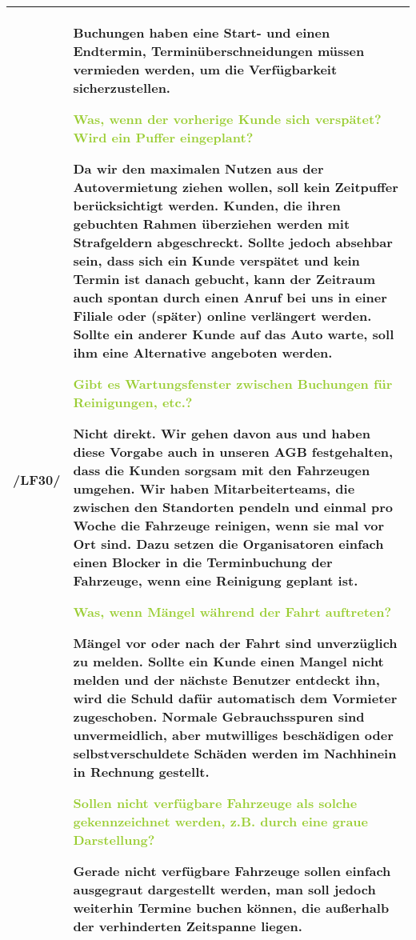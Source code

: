 \begin{tabular}{l | p{13cm}}
    \hline
    /LF30/ & Buchungen haben eine Start- und einen Endtermin, Terminüberschneidungen müssen vermieden werden, um die Verfügbarkeit sicherzustellen. 
    
    \textcolor{YellowGreen}{Was, wenn der vorherige Kunde sich verspätet? Wird ein Puffer eingeplant?}

    \textcolor{NavyBlue}{Da wir den maximalen Nutzen aus der Autovermietung ziehen wollen, soll kein Zeitpuffer berücksichtigt werden. Kunden, die ihren gebuchten Rahmen überziehen werden mit Strafgeldern abgeschreckt. Sollte jedoch absehbar sein, dass sich ein Kunde verspätet und kein Termin ist danach gebucht, kann der Zeitraum auch spontan durch einen Anruf bei uns in einer Filiale oder (später) online verlängert werden. Sollte ein anderer Kunde auf das Auto warte, soll ihm eine Alternative angeboten werden.}

    \textcolor{YellowGreen}{Gibt es Wartungsfenster zwischen Buchungen für Reinigungen, etc.?}

    \textcolor{NavyBlue}{Nicht direkt. Wir gehen davon aus und haben diese Vorgabe auch in unseren AGB festgehalten, dass die Kunden sorgsam mit den Fahrzeugen umgehen. Wir haben Mitarbeiterteams, die zwischen den Standorten pendeln und einmal pro Woche die Fahrzeuge reinigen, wenn sie mal vor Ort sind. Dazu setzen die Organisatoren einfach einen Blocker in die Terminbuchung der Fahrzeuge, wenn eine Reinigung geplant ist.}

    \textcolor{YellowGreen}{Was, wenn Mängel während der Fahrt auftreten?}

    \textcolor{NavyBlue}{Mängel vor oder nach der Fahrt sind unverzüglich zu melden. Sollte ein Kunde einen Mangel nicht melden und der nächste Benutzer entdeckt ihn, wird die Schuld dafür automatisch dem Vormieter zugeschoben. Normale Gebrauchsspuren sind unvermeidlich, aber mutwilliges beschädigen oder selbstverschuldete Schäden werden im Nachhinein in Rechnung gestellt.}

    \textcolor{YellowGreen}{Sollen nicht verfügbare Fahrzeuge als solche gekennzeichnet werden, z.B. durch eine graue Darstellung?}

    \textcolor{NavyBlue}{Gerade nicht verfügbare Fahrzeuge sollen einfach ausgegraut dargestellt werden, man soll jedoch weiterhin Termine buchen können, die außerhalb der verhinderten Zeitspanne liegen.} \\

    \hline
\end{tabular}

